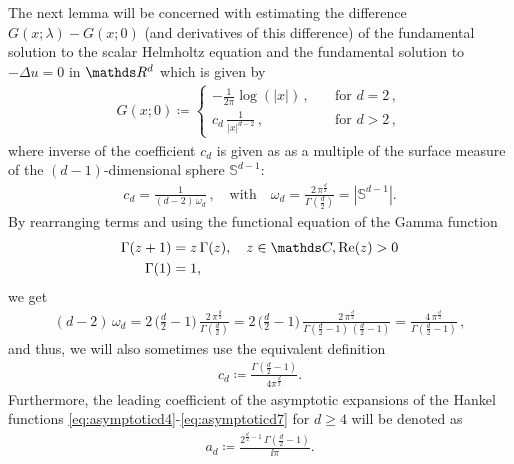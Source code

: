 The next lemma will be concerned with estimating the difference $G(x;\lambda) - G(x; 0)$ (and derivatives of this difference) of the fundamental solution to the scalar Helmholtz equation and the fundamental solution to $-\Delta u = 0$ in $\R^d$ which is given by
\begin{align}
  \label{eq:laplace}
  G(x;0) \coloneqq \begin{cases} -\frac{1}{2\pi} \log(|x|)\,, &\quad\text{for } d = 2\,, \\
                                 c_d \, \frac{1}{|x|^{d - 2}}\,, &\quad\text{for } d > 2\,,  \end{cases}
\end{align}
where inverse of the coefficient $c_d$ is given as as a multiple of the surface measure of the $(d-1)$-dimensional sphere $\mathbb{S}^{d - 1}$:
\begin{align}
  \label{eq:wd}
  c_d = \frac{1}{(d - 2) \, \omega_d}\,, \quad\text{with}\quad \omega_d = \frac{2\,\pi^{\frac{d}{2}}}{\Gamma(\frac{d}{2})} = |\mathbb{S}^{d - 1}|.
\end{align}
By rearranging terms and using the functional equation of the Gamma function 
\begin{align}
  \label{eq:functionalGamma}
  \begin{alignedat}{1}
    \Gamma(z + 1) &= z\, \Gamma(z), \quad z \in \C, \Re(z) > 0 \\
    \Gamma(1) &= 1,
  \end{alignedat}
\end{align}
we get
\begin{align*}
  (d - 2)\, \omega_d 
  = 2  \, \bigg( \frac{d}{2} - 1\bigg)\, \frac{2\, \pi^{\frac{d}{2}}}{\Gamma(\frac{d}{2})}
  =  2 \, \bigg( \frac{d}{2} - 1\bigg)\, \frac{2\, \pi^{\frac{d}{2}}}{\Gamma(\frac{d}{2} - 1)\,(\frac{d}{2} - 1)}
  = \frac{4\, \pi^{\frac{d}{2}}}{\Gamma(\frac{d}{2} - 1)}\,,
\end{align*}
and thus, we will also sometimes use the equivalent definition
\begin{align}
  \label{eq:defncd}
  c_d \coloneqq \frac{\Gamma(\frac{d}{2} - 1)}{4 \pi^{\frac{d}{2}}}.
\end{align}
Furthermore, the leading coefficient of the asymptotic expansions of the Hankel functions \eqref{eq:asymptoticd4}-\eqref{eq:asymptoticd7} for $d \geq 4$ will be denoted as
\begin{align}
  \label{eq:Defnad}
  a_d \coloneqq \frac{2^{\frac{d}{2} - 1}\, \Gamma(\frac{d}{2} - 1)}{\ii \pi}.
\end{align}

